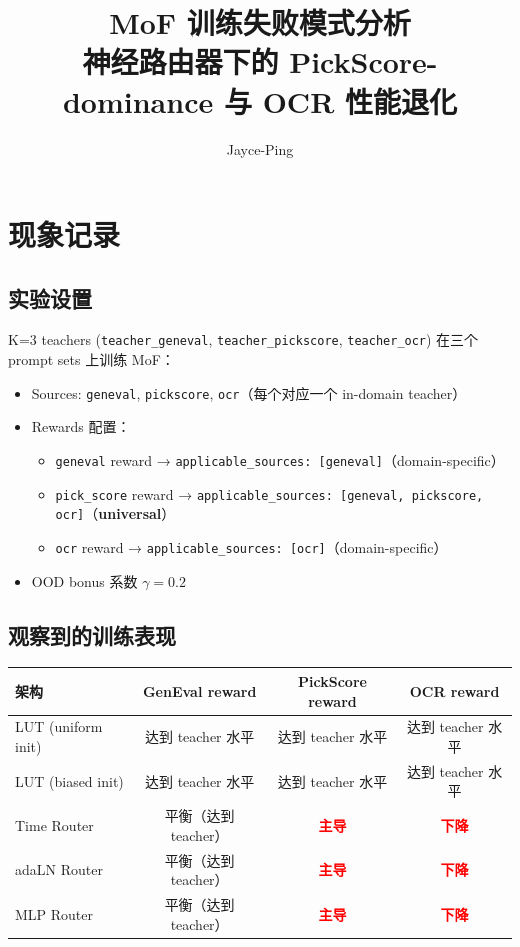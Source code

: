 \documentclass[11pt,a4paper]{article}
\title{\textbf{MoF 训练失败模式分析}\\[0.3em]
\large 神经路由器下的 PickScore-dominance 与 OCR 性能退化}
\author{Jayce-Ping}
\date{}
\begin{document}
\maketitle

\section{现象记录}

\subsection{实验设置}

K=3 teachers (\texttt{teacher\_geneval}, \texttt{teacher\_pickscore}, \texttt{teacher\_ocr}) 在三个 prompt sets 上训练 MoF：

\begin{itemize}
    \item Sources: \texttt{geneval}, \texttt{pickscore}, \texttt{ocr}（每个对应一个 in-domain teacher）
    \item Rewards 配置：
        \begin{itemize}
            \item \texttt{geneval} reward → \texttt{applicable\_sources: [geneval]}（domain-specific）
            \item \texttt{pick\_score} reward → \texttt{applicable\_sources: [geneval, pickscore, ocr]}（\textbf{universal}）
            \item \texttt{ocr} reward → \texttt{applicable\_sources: [ocr]}（domain-specific）
        \end{itemize}
    \item OOD bonus 系数 $\gamma = 0.2$
\end{itemize}

\subsection{观察到的训练表现}

\begin{center}
\begin{tabular}{l|ccc}
\toprule
\textbf{架构} & \textbf{GenEval reward} & \textbf{PickScore reward} & \textbf{OCR reward} \\
\midrule
LUT (uniform init) & 达到 teacher 水平 & 达到 teacher 水平 & 达到 teacher 水平 \\
LUT (biased init)  & 达到 teacher 水平 & 达到 teacher 水平 & 达到 teacher 水平 \\
\midrule
Time Router        & 平衡（达到 teacher） & \textcolor{red}{\textbf{主导}} & \textcolor{red}{\textbf{下降}} \\
adaLN Router       & 平衡（达到 teacher） & \textcolor{red}{\textbf{主导}} & \textcolor{red}{\textbf{下降}} \\
MLP Router         & 平衡（达到 teacher） & \textcolor{red}{\textbf{主导}} & \textcolor{red}{\textbf{下降}} \\
\bottomrule
\end{tabular}
\end{center}
\end{document}
